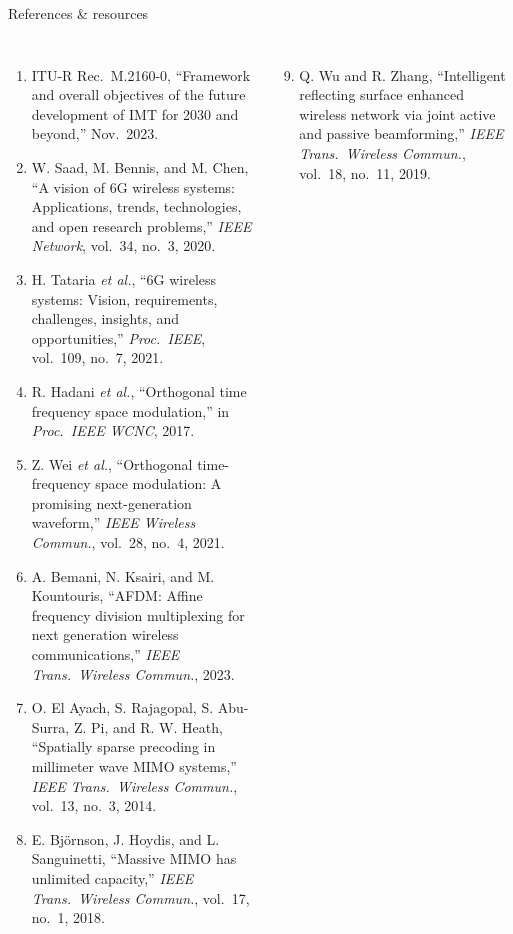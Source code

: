\begin{frame}{References \& resources}
  \tiny
  \begin{columns}[T]
    \begin{enumerate}\itemsep0pt
      \item ITU-R Rec.\ M.2160-0, ``Framework and overall objectives of the
            future development of IMT for 2030 and beyond,'' Nov.\ 2023.
      \item W. Saad, M. Bennis, and M. Chen, ``A vision of 6G wireless
            systems: Applications, trends, technologies, and open research
            problems,'' \emph{IEEE Network}, vol.\ 34, no.\ 3, 2020.
      \item H. Tataria \emph{et al.}, ``6G wireless systems: Vision,
            requirements, challenges, insights, and opportunities,''
            \emph{Proc.\ IEEE}, vol.\ 109, no.\ 7, 2021.
      \item R. Hadani \emph{et al.}, ``Orthogonal time frequency space
            modulation,'' in \emph{Proc.\ IEEE WCNC}, 2017.
      \item Z. Wei \emph{et al.}, ``Orthogonal time-frequency space
            modulation: A promising next-generation waveform,'' \emph{IEEE
            Wireless Commun.}, vol.\ 28, no.\ 4, 2021.
      \item A. Bemani, N. Ksairi, and M. Kountouris, ``AFDM: Affine frequency
            division multiplexing for next generation wireless
            communications,'' \emph{IEEE Trans.\ Wireless Commun.}, 2023.
      \item O. El Ayach, S. Rajagopal, S. Abu-Surra, Z. Pi, and R. W. Heath,
            ``Spatially sparse precoding in millimeter wave MIMO systems,''
            \emph{IEEE Trans.\ Wireless Commun.}, vol.\ 13, no.\ 3, 2014.
      \item E. Bj\"ornson, J. Hoydis, and L. Sanguinetti, ``Massive MIMO has
            unlimited capacity,'' \emph{IEEE Trans.\ Wireless Commun.},
            vol.\ 17, no.\ 1, 2018.
    \end{enumerate}
    \begin{enumerate}\setcounter{enumi}{8}\itemsep0pt
      \item Q. Wu and R. Zhang, ``Intelligent reflecting surface enhanced
            wireless network via joint active and passive beamforming,''
            \emph{IEEE Trans.\ Wireless Commun.}, vol.\ 18, no.\ 11, 2019.

\end{enumerate}
\end{columns}
\end{frame}
